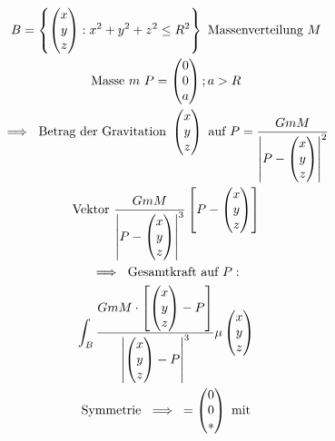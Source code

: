 \begin{bsp*}[note = homogene Kugel mit Radius $R$]
	\begin{gather*}
		B = \left\{ \begin{pmatrix} x \\ y \\ z \end{pmatrix} : x^2 + y^2 + z^2 \leq R^2 \right\} \text{ Massenverteilung } M \\
		\text{Masse $m$ } P = \begin{pmatrix} 0 \\ 0 \\ a \end{pmatrix} ; a > R \\
		\implies \text{ Betrag der Gravitation } \begin{pmatrix} x \\ y \\ z \end{pmatrix} \text{ auf } P = \frac{G m M}{\abs{P - \begin{pmatrix} x \\ y \\ z \end{pmatrix}}^2} \\
		\text{Vektor } \frac{G m M}{\abs{P - \begin{pmatrix} x \\ y \\ z \end{pmatrix}}^3} \left[ P - \begin{pmatrix} x \\ y \\ z \end{pmatrix} \right] \\
		\implies \text{ Gesamtkraft auf } P : \\
		\int_B \frac{G m M \cdot \left[ \begin{pmatrix} x \\ y \\ z \end{pmatrix} - P \right]}{\abs{\begin{pmatrix} x \\ y \\ z \end{pmatrix} - P}^3} \mu\begin{pmatrix} x \\ y \\ z \end{pmatrix} \\
		\text{Symmetrie } \implies = \begin{pmatrix} 0 \\ 0 \\ * \end{pmatrix} \text{ mit} \\

\end{gather*}
\end{bsp*}
